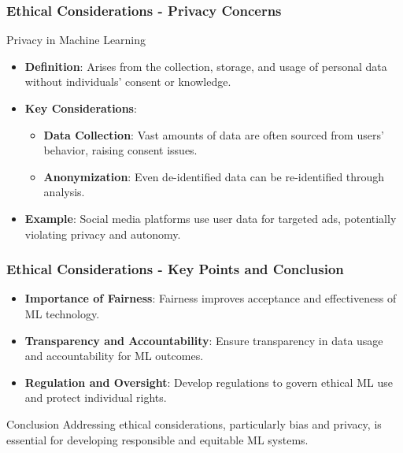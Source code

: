 \documentclass[aspectratio=169]{beamer}
\begin{document}
\begin{frame}[fragile]
    \frametitle{Ethical Considerations - Privacy Concerns}
    \begin{block}{Privacy in Machine Learning}
        \begin{itemize}
            \item \textbf{Definition}: Arises from the collection, storage, and usage of personal data without individuals' consent or knowledge.
        \end{itemize}
    \end{block}
    
    \begin{itemize}
        \item \textbf{Key Considerations}:
            \begin{itemize}
                \item \textbf{Data Collection}: Vast amounts of data are often sourced from users’ behavior, raising consent issues.
                \item \textbf{Anonymization}: Even de-identified data can be re-identified through analysis.
            \end{itemize}
        
        \item \textbf{Example}: Social media platforms use user data for targeted ads, potentially violating privacy and autonomy.
    \end{itemize}
\end{frame}

\begin{frame}[fragile]
    \frametitle{Ethical Considerations - Key Points and Conclusion}
    \begin{itemize}
        \item \textbf{Importance of Fairness}: Fairness improves acceptance and effectiveness of ML technology.
        
        \item \textbf{Transparency and Accountability}: Ensure transparency in data usage and accountability for ML outcomes.
        
        \item \textbf{Regulation and Oversight}: Develop regulations to govern ethical ML use and protect individual rights.
    \end{itemize}
    
    \begin{block}{Conclusion}
        Addressing ethical considerations, particularly bias and privacy, is essential for developing responsible and equitable ML systems.
    \end{block}
\end{frame}
\end{document}
